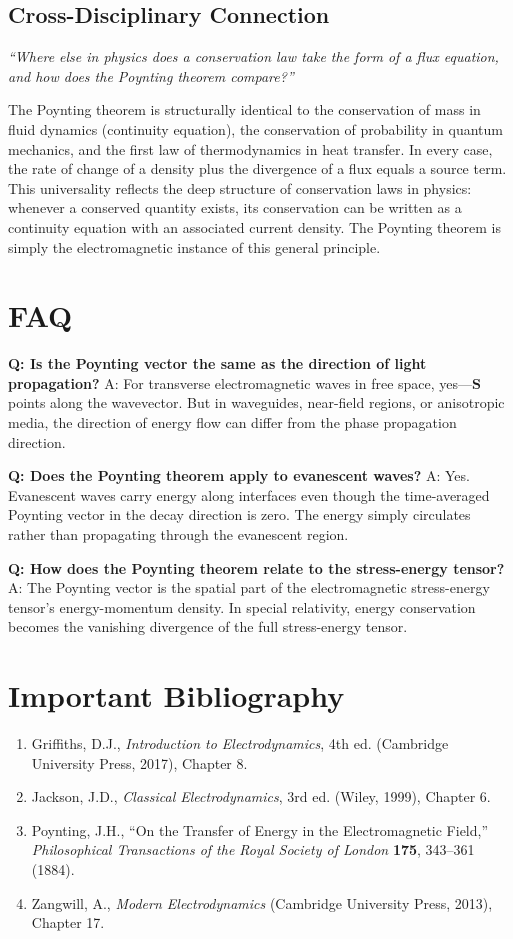 \subsection*{Cross-Disciplinary Connection}
\textit{``Where else in physics does a conservation law take the form of a flux equation, and how does the Poynting theorem compare?''}

The Poynting theorem is structurally identical to the conservation of mass in fluid dynamics (continuity equation), the conservation of probability in quantum mechanics, and the first law of thermodynamics in heat transfer. In every case, the rate of change of a density plus the divergence of a flux equals a source term. This universality reflects the deep structure of conservation laws in physics: whenever a conserved quantity exists, its conservation can be written as a continuity equation with an associated current density. The Poynting theorem is simply the electromagnetic instance of this general principle.

\section*{FAQ}

\textbf{Q: Is the Poynting vector the same as the direction of light propagation?}
A: For transverse electromagnetic waves in free space, yes---$\mathbf{S}$ points along the wavevector. But in waveguides, near-field regions, or anisotropic media, the direction of energy flow can differ from the phase propagation direction.

\textbf{Q: Does the Poynting theorem apply to evanescent waves?}
A: Yes. Evanescent waves carry energy along interfaces even though the time-averaged Poynting vector in the decay direction is zero. The energy simply circulates rather than propagating through the evanescent region.

\textbf{Q: How does the Poynting theorem relate to the stress-energy tensor?}
A: The Poynting vector is the spatial part of the electromagnetic stress-energy tensor's energy-momentum density. In special relativity, energy conservation becomes the vanishing divergence of the full stress-energy tensor.
\section*{Important Bibliography}

\begin{enumerate}
\item Griffiths, D.J., \textit{Introduction to Electrodynamics}, 4th ed. (Cambridge University Press, 2017), Chapter 8.
\item Jackson, J.D., \textit{Classical Electrodynamics}, 3rd ed. (Wiley, 1999), Chapter 6.
\item Poynting, J.H., ``On the Transfer of Energy in the Electromagnetic Field,'' \textit{Philosophical Transactions of the Royal Society of London} \textbf{175}, 343--361 (1884).
\item Zangwill, A., \textit{Modern Electrodynamics} (Cambridge University Press, 2013), Chapter 17.
\end{enumerate}

